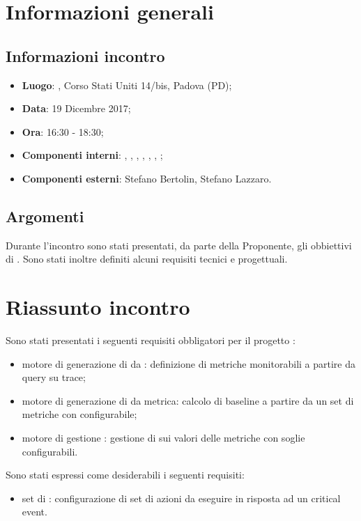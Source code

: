 \section{Informazioni generali}

\subsection{Informazioni incontro}
\begin{itemize}
\item \textbf{Luogo}: \Proponente{}, Corso Stati Uniti 14/bis, Padova (PD);
\item \textbf{Data}: 19 Dicembre 2017;
\item \textbf{Ora}: 16:30 - 18:30;
\item \textbf{Componenti interni}: \Leonardo, \Tommaso, \Carlo, \Mattia, \Luca, \Cristian, \Isacco;
\item \textbf{Componenti esterni}: Stefano Bertolin, Stefano Lazzaro.
\end{itemize}

\subsection{Argomenti}
Durante l'incontro sono stati presentati, da parte della Proponente, gli obbiettivi di \ProjectName{}.
Sono stati inoltre definiti alcuni requisiti tecnici e progettuali.

\section{Riassunto incontro}
Sono stati presentati i seguenti requisiti obbligatori per il progetto \ProjectName{}:
\begin{itemize}
\item motore di generazione di  da : definizione di metriche monitorabili a
partire da query su trace;
\item motore di generazione di  da metrica: calcolo di baseline a partire da un set di metriche
con  configurabile;
\item motore di gestione : gestione di  sui valori delle metriche con
soglie configurabili.
\end{itemize}

Sono stati espressi come desiderabili i seguenti requisiti:
\begin{itemize}
\item set di : configurazione di set di azioni da eseguire in risposta ad un
critical event.
\end{itemize}

